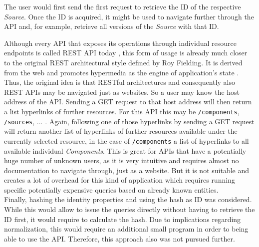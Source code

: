 The user would first send the first request to retrieve the ID of the respective \emph{Source}. Once the ID is acquired, it might be used to navigate further through the API and, for example, retrieve all versions of the \emph{Source} with that ID.\par
Although every API that exposes its operations through individual resource endpoints is called REST API today \cite{RichardsonMaturityModel}, this form of usage is already much closer to the original REST architectural style defined by Roy Fielding. It is derived from the web and promotes hypermedia as the engine of application's state \cite{RESTArchitecturalStyle}. Thus, the original idea is that RESTful architectures and consequently also REST APIs may be navigated just as websites. So a user may know the host address of the API. Sending a GET request to that host address will then return a list hyperlinks of further resources. For this API this may be \lstinline|/components|, \lstinline|/sources|, ... . Again, following one of those hyperlinks by sending a GET request will return another list of hyperlinks of further resources available under the currently selected resource, in the case of \lstinline|/components| a list of hyperlinks to all available individual \emph{Components}. This is great for APIs that have a potentially huge number of unknown users, as it is very intuitive and requires almost no documentation to navigate through, just as a website. But it is not suitable and creates a lot of overhead for this kind of application which requires running specific potentially expensive queries based on already known entities.\\

Finally, hashing the identity properties and using the hash as ID was considered. While this would allow to issue the queries directly without having to retrieve the ID first, it would require to calculate the hash. Due to implications regarding normalization, this would require an additional small program in order to being able to use the API. Therefore, this approach also was not pursued further.

